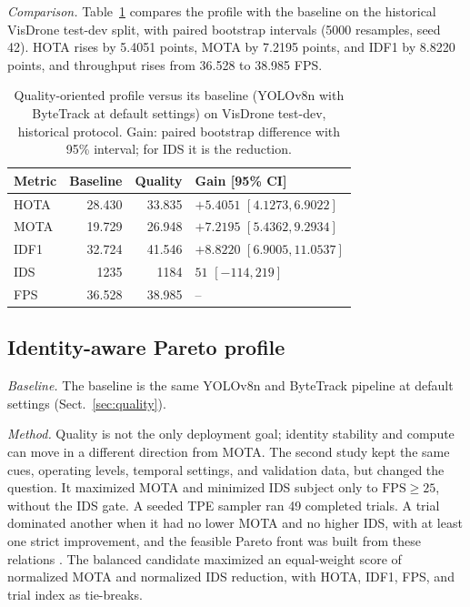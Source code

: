 \emph{Comparison.} Table~\ref{tab:quality} compares the profile with the
baseline on the historical VisDrone test-dev split, with paired bootstrap
intervals (5000 resamples, seed 42). HOTA rises by 5.4051 points, MOTA by
7.2195 points, and IDF1 by 8.8220 points, and throughput rises from 36.528 to
38.985 FPS.

\begin{table}[t]
\caption{Quality-oriented profile versus its baseline (YOLOv8n with ByteTrack
at default settings) on VisDrone test-dev, historical protocol. Gain: paired
bootstrap difference with 95\% interval; for IDS it is the reduction.}
\label{tab:quality}
\centering\footnotesize
\setlength{\tabcolsep}{4pt}
\begin{tabular}{@{}lrrl@{}}
\toprule
Metric & Baseline & Quality & Gain [95\% CI]\\
\midrule
HOTA & 28.430 & 33.835 & $+5.4051$ $[4.1273, 6.9022]$\\
MOTA & 19.729 & 26.948 & $+7.2195$ $[5.4362, 9.2934]$\\
IDF1 & 32.724 & 41.546 & $+8.8220$ $[6.9005, 11.0537]$\\
IDS & 1235 & 1184 & $51$ $[-114, 219]$\\
FPS & 36.528 & 38.985 & --\\
\bottomrule
\end{tabular}
\end{table}

\subsection{Identity-aware Pareto profile}\label{sec:identity}

\emph{Baseline.} The baseline is the same YOLOv8n and ByteTrack pipeline at
default settings (Sect.~\ref{sec:quality}).

\emph{Method.} Quality is not the only deployment goal; identity stability and
compute can move in a different direction from MOTA. The second study kept
the same cues, operating levels, temporal settings, and validation data, but
changed the question. It maximized MOTA and minimized IDS subject only to
$\mathrm{FPS}\geq25$, without the IDS gate. A seeded TPE sampler ran 49
completed trials. A trial dominated another when it had no lower MOTA and no
higher IDS, with at least one strict improvement, and the feasible Pareto
front was built from these relations \cite{deb2002nsga2}. The balanced
candidate maximized an equal-weight score of normalized MOTA and normalized IDS
reduction, with HOTA, IDF1, FPS, and trial index as tie-breaks.

